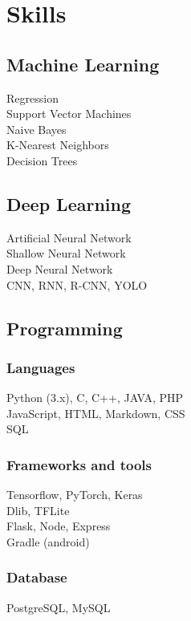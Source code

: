 \section{Skills}

\subsection{Machine Learning}
Regression \\
Support Vector Machines \\
Naive Bayes \\
K-Nearest Neighbors \\
Decision Trees \\

\sectionspace %

\subsection{Deep Learning}
Artificial Neural Network \\
Shallow Neural Network \\
Deep Neural Network \\
CNN, RNN, R-CNN, YOLO \\

\sectionspace

\subsection{Programming}

\subsubsection*{Languages}
Python (3.x), C, C++, JAVA, PHP \\
JavaScript, HTML, Markdown, CSS \\
SQL \\

\subsubsection*{Frameworks and tools}
Tensorflow, PyTorch, Keras\\
Dlib, TFLite \\
Flask, Node, Express \\
Gradle (android) \\

\subsubsection*{Database}
PostgreSQL, MySQL \\

